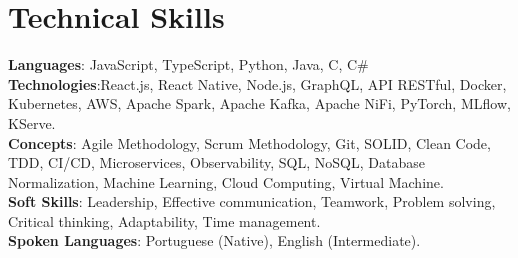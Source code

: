 \section{Technical Skills}
\begin{itemize}[leftmargin=0.15in, label={}]
	\small{\item{
	      \textbf{Languages}{: JavaScript, TypeScript, Python, Java, C, C\#} \\
	      \textbf{Technologies}{:React.js, React Native, Node.js, GraphQL, API RESTful, Docker, Kubernetes, AWS, Apache Spark, Apache Kafka, Apache NiFi, PyTorch, MLflow, KServe.} \\
	      \textbf{Concepts}{: Agile Methodology, Scrum Methodology, Git, SOLID, Clean Code, TDD, CI/CD, Microservices, Observability, SQL, NoSQL, Database Normalization, Machine Learning, Cloud Computing, Virtual Machine.}\\
	      \textbf{Soft Skills}{: Leadership, Effective communication, Teamwork, Problem solving, Critical thinking, Adaptability, Time management.}\\
		  \textbf{Spoken Languages}{: Portuguese (Native), English (Intermediate).}
	      }}
\end{itemize}
